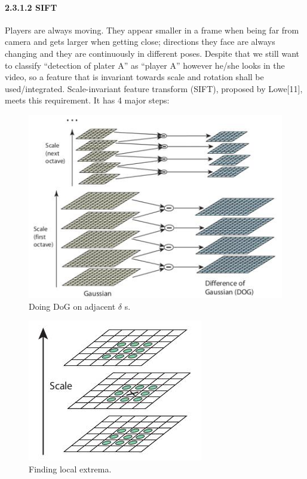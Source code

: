 \documentclass{article}
\begin{document}
\paragraph{2.3.1.2 SIFT}
Players are always moving. They appear smaller in a frame when being far from camera and gets larger when getting close; directions they face are always changing and they are continuously in different poses. Despite that we still want to classify “detection of plater A” as “player A” however he/she looks in the video, so a feature that is invariant towards scale and rotation shall be used/integrated. Scale-invariant feature transform (SIFT), proposed by Lowe[11], meets this requirement. It has 4 major steps:
\begin{figure}
  \centering
  \includegraphics[scale=0.5]{report/pic/2/sift_dog.jpg} 
  \caption{Doing DoG on adjacent $\delta$ s.}
\end{figure}
\begin{figure}
  \centering
  \includegraphics[scale=0.5]{report/pic/2/sift_local_extrema.jpg} 
  \caption{Finding local extrema.}
\end{figure}
\end{document}
